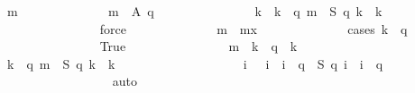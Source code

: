 \begin{isabellebody}
\ m{\isacharprime}\isanewline
\ \ \ \ \ \ \ \ \ \ \ \ \isamarkupfalse%
\ {\isachardoublequoteopen}m{\isacharprime}\ {\isasymin}\ {\isacharquery}A\ {\isacharparenleft}q{\isacharplus}{}{\isacharparenright}{\isachardoublequoteclose}\isanewline
\ \ \ \ \ \ \ \ \ \ \ \ \isamarkupfalse%
\ \isamarkupfalse%
\ k\ \ {\isachardoublequoteopen}k\ {\isasymin}\ {\isacharbraceleft}{}{\isachardot}{\isachardot}{\isacharless}q{\isacharplus}{}{\isacharplus}{}{\isacharbraceright}{\isachardoublequoteclose}\ {\isachardoublequoteopen}m{\isacharprime}\ {\isacharequal}\ {\isacharquery}S\ {\isacharparenleft}q{\isacharplus}{}{\isacharparenright}\ k\ {\isacharslash}\ k{\isachardoublequoteclose}\isanewline
\ \ \ \ \ \ \ \ \ \ \ \ \ \ \isamarkupfalse%
\ force\isanewline
\ \ \ \ \ \ \ \ \ \ \ \ \isamarkupfalse%
\ {\isachardoublequoteopen}m{\isacharprime}\ {\isasymle}\ {\isacharquery}mx{\isachardoublequoteclose}\isanewline
\ \ \ \ \ \ \ \ \ \ \ \ \isamarkupfalse%
\ {\isacharparenleft}cases\ {\isachardoublequoteopen}k\ {\isasymle}\ q{\isachardoublequoteclose}{\isacharparenright}\isanewline
\ \ \ \ \ \ \ \ \ \ \ \ \ \ \isamarkupfalse%
\ True\isanewline
\ \ \ \ \ \ \ \ \ \ \ \ \ \ \isamarkupfalse%
\ {\isachardoublequoteopen}m{\isacharprime}\ {\isacharequal}\ {\isacharparenleft}k\ {\isacharminus}\ {}{\isacharslash}q{\isacharparenright}\ {\isacharslash}\ k{\isachardoublequoteclose}\isanewline
\ \ \ \ \ \ \ \ \ \ \ \ \ \ \ \ \isamarkupfalse%
\ {\isacharbackquoteopen}k\ {\isasymin}\ {\isacharbraceleft}{}{\isachardot}{\isachardot}{\isacharless}q{\isacharplus}{}{\isacharplus}{}{\isacharbraceright}{\isacharbackquoteclose}\ {\isacharbackquoteopen}m{\isacharprime}\ {\isacharequal}\ {\isacharquery}S\ {\isacharparenleft}q{\isacharplus}{}{\isacharparenright}\ k\ {\isacharslash}\ k{\isacharbackquoteclose}\ \isanewline
\ \ \ \ \ \ \ \ \ \ \ \ \ \ \ \ \isamarkupfalse%
\ {\isacharbackquoteopen}{\isasymforall}\ i{\isachardot}\ {}\ {\isasymle}\ i\ {\isasymand}\ i\ {\isasymle}\ q\ {\isasymlongrightarrow}\ {\isacharquery}S\ {\isacharparenleft}q{\isacharplus}{}{\isacharparenright}\ i\ {\isacharequal}\ i\ {\isacharminus}\ {}{\isacharslash}q{\isacharbackquoteclose}\isanewline
\ \ \ \ \ \ \ \ \ \ \ \ \ \ \ \ \isamarkupfalse%
\ auto\isanewline
\ \ \ \ \ \ \ \ \ \ \ \ \ \ \isamarkupfalse%

\end{isabellebody}
